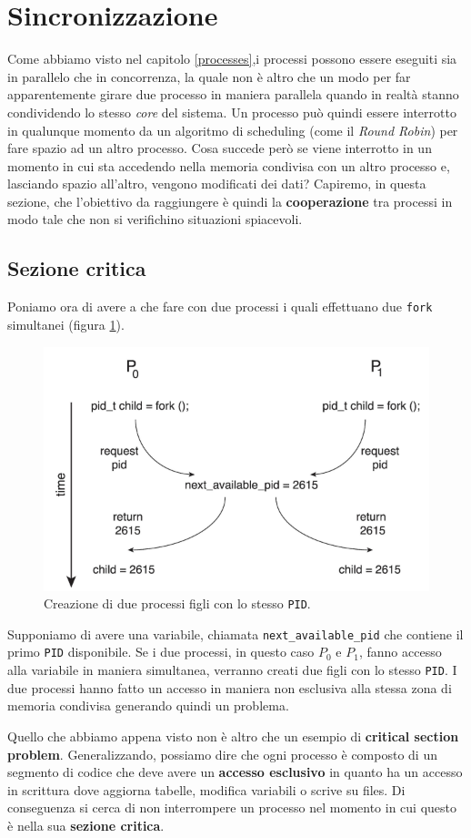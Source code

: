 \pagebreak
\section{Sincronizzazione}\label{sincronizzazione}
Come abbiamo visto nel capitolo \ref{processes},i processi possono essere eseguiti sia in parallelo che in concorrenza, la quale non è altro che un modo per far apparentemente girare due processo in maniera parallela quando in realtà stanno condividendo lo stesso \textit{core} del sistema. Un processo può quindi essere interrotto in qualunque momento da un algoritmo di scheduling (come il \textit{Round Robin}) per fare spazio ad un altro processo. Cosa succede però se viene interrotto in un momento in cui sta accedendo nella memoria condivisa con un altro processo e, lasciando spazio all'altro, vengono modificati dei dati? Capiremo, in questa sezione, che l'obiettivo da raggiungere è quindi la \textbf{cooperazione} tra processi in modo tale che non si verifichino situazioni spiacevoli.

\subsection{Sezione critica}
Poniamo ora di avere a che fare con due processi i quali effettuano due \texttt{fork} simultanei (figura \ref{fig:sim_fork_issue}).
\begin{figure}[!h]
    \centering
    \includegraphics[width=.5\textwidth]{../res/imgs/synchronization/sim_fork_issue.png}
    \caption{Creazione di due processi figli con lo stesso \texttt{PID}.}
    \label{fig:sim_fork_issue}
\end{figure}
Supponiamo di avere una variabile, chiamata \texttt{next\_available\_pid} che contiene il primo \texttt{PID} disponibile. Se i due processi, in questo caso $P_0$ e $P_1$, fanno accesso alla variabile in maniera simultanea, verranno creati due figli con lo stesso \texttt{PID}. I due processi hanno fatto un accesso in maniera non esclusiva alla stessa zona di memoria condivisa generando quindi un problema.

Quello che abbiamo appena visto non è altro che un esempio di \textbf{critical section problem}. Generalizzando, possiamo dire che ogni processo è composto di un segmento di codice che deve avere un \textbf{accesso esclusivo} in quanto ha un accesso in scrittura dove aggiorna tabelle, modifica variabili o scrive su files. Di conseguenza si cerca di non interrompere un processo nel momento in cui questo è nella sua \textbf{sezione critica}.
% 
